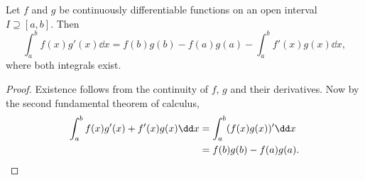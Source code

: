 \begin{exercise}
    Let $f$ and $g$ be continuously differentiable functions on an
    open interval $I \supseteq [a, b]$.
    Then \[
        \int_a^b f(x) g'(x) \dd x = f(b) g(b) - f(a) g(a)
            - \int_a^b f'(x) g(x) \dd x,
    \] where both integrals exist.
\end{exercise}
\begin{proof}
    Existence follows from the continuity of $f$, $g$ and their derivatives.
    Now by the second fundamental theorem of calculus, \begin{align*}
        \int_a^b f(x) g'(x) + f'(x) g(x) \dd x
            &= \int_a^b (f(x) g(x))' \dd x \\
            &= f(b) g(b) - f(a) g(a). \qedhere
    \end{align*}
\end{proof}

